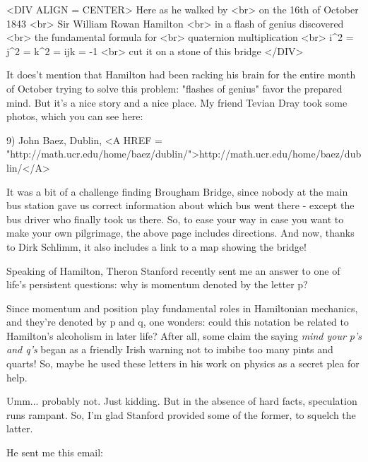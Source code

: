 <DIV ALIGN = CENTER>
                    Here as he walked by <br>
                 on the 16th of October 1843 <br>
                 Sir William Rowan Hamilton <br>
               in a flash of genius discovered <br>
                the fundamental formula for <br>
                 quaternion multiplication <br>
                i^{2} = j^{2} = k^{2} = ijk = -1 <br>
             \text{\&}  cut it on a stone of this bridge
</DIV>

It does't mention that Hamilton had been racking his brain for the
entire month of October trying to solve this problem: "flashes of
genius" favor the prepared mind.  But it's a nice story and a nice place.
My friend Tevian Dray took some photos, which you can see here:

9) John Baez, Dublin, <A HREF = "http://math.ucr.edu/home/baez/dublin/">http://math.ucr.edu/home/baez/dublin/</A>

It was a bit of a challenge finding Brougham Bridge, since nobody at the main
bus station gave us correct information about which bus went there - except 
the bus driver who finally took us there.  So, to ease your way in case
you want to make your own pilgrimage, the above page includes directions. 
And now, thanks to Dirk Schlimm, it also includes a link to a map showing 
the bridge!  

Speaking of Hamilton, Theron Stanford recently sent me an answer to one of 
life's persistent questions: why is momentum denoted by the letter p?  

Since momentum and position play fundamental roles in Hamiltonian mechanics, 
and they're denoted by p and q, one wonders: could this notation be related 
to Hamilton's alcoholism in later life?  After all, some claim the saying 
\emph{mind your p's and q's} began as a friendly Irish warning not
to imbibe too many pints and quarts!  So, maybe he used these letters
in his work on physics as a secret plea for help.

Umm... probably not.  Just kidding.  But in the absence of hard facts, 
speculation runs rampant.  So, I'm glad Stanford provided some of the former, 
to squelch the latter.

He sent me this email:

